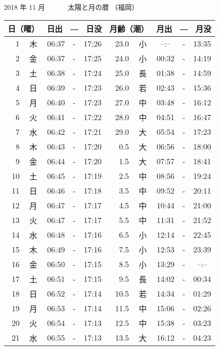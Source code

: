 \documentclass[a4j,10pt]{jsarticle}
\begin{document}
\begin{center}
\begin{table}[ht]
\end{table}
\newpage
  {\large 2018 年 11 月}
  {\Large 　　　太陽と月の暦   （福岡） }
  \begin{table}[ht]
  \begin{center}
     \begin{tabular}{|rc|ccc|rc|ccc|}
     \hline
     \multicolumn{2}{|c|}{日（曜）} & \multicolumn{3}{c|}{日出　―　日没} & \multicolumn{2}{c|}{月齢（潮）} & \multicolumn{3}{c|}{月出　―　月没}\\
     \hline
  1 & 木 & 06:37 &-& 17:26 & 23.0 & 小 &  --:--  &-& 13:35 \\
  2 & 金 & 06:37 &-& 17:25 & 24.0 & 小 & 00:32 &-& 14:19 \\
  3 & 土 & 06:38 &-& 17:24 & 25.0 & 長 & 01:38 &-& 14:59 \\
  4 & 日 & 06:39 &-& 17:23 & 26.0 & 若 & 02:43 &-& 15:36 \\
  5 & 月 & 06:40 &-& 17:23 & 27.0 & 中 & 03:48 &-& 16:12 \\
  6 & 火 & 06:41 &-& 17:22 & 28.0 & 中 & 04:51 &-& 16:47 \\
  7 & 水 & 06:42 &-& 17:21 & 29.0 & 大 & 05:54 &-& 17:23 \\
  8 & 木 & 06:43 &-& 17:20 &  0.5 & 大 & 06:56 &-& 18:00 \\
  9 & 金 & 06:44 &-& 17:20 &  1.5 & 大 & 07:57 &-& 18:41 \\
 10 & 土 & 06:45 &-& 17:19 &  2.5 & 中 & 08:56 &-& 19:24 \\
 11 & 日 & 06:46 &-& 17:18 &  3.5 & 中 & 09:52 &-& 20:11 \\
 12 & 月 & 06:47 &-& 17:17 &  4.5 & 中 & 10:44 &-& 21:00 \\
 13 & 火 & 06:47 &-& 17:17 &  5.5 & 中 & 11:31 &-& 21:52 \\
 14 & 水 & 06:48 &-& 17:16 &  6.5 & 小 & 12:14 &-& 22:45 \\
 15 & 木 & 06:49 &-& 17:16 &  7.5 & 小 & 12:53 &-& 23:39 \\
 16 & 金 & 06:50 &-& 17:15 &  8.5 & 小 & 13:29 &-&  --:--  \\
 17 & 土 & 06:51 &-& 17:15 &  9.5 & 長 & 14:02 &-& 00:34 \\
 18 & 日 & 06:52 &-& 17:14 & 10.5 & 若 & 14:34 &-& 01:29 \\
 19 & 月 & 06:53 &-& 17:14 & 11.5 & 中 & 15:06 &-& 02:26 \\
 20 & 火 & 06:54 &-& 17:13 & 12.5 & 中 & 15:38 &-& 03:23 \\
 21 & 水 & 06:55 &-& 17:13 & 13.5 & 大 & 16:12 &-& 04:23 \\

\end{tabular}
\end{center}
\end{table}
\end{center}
\end{document}
